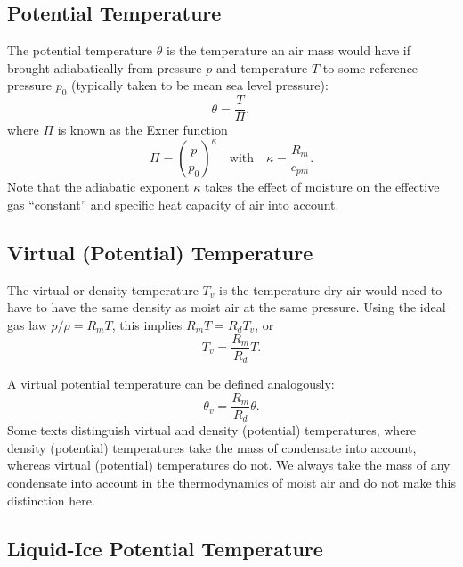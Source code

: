 \documentclass{report}
\begin{document}
\subsection{Potential Temperature} The potential temperature $\theta$ is the temperature an air mass would have if brought adiabatically from pressure $p$ and temperature $T$ to some reference pressure $p_0$ (typically taken to be mean sea level pressure):
\begin{equation}\label{e:pot_temp_press_T}
\theta = \frac{T}{\Pi},  
\end{equation}
where $\Pi$ is known as the Exner function
\begin{equation}
    \Pi  = \left( \frac{p}{p_0} \right)^\kappa \quad \text{with} \quad \kappa = \frac{R_m}{c_{pm}}.
\end{equation}
Note that the adiabatic exponent $\kappa$ takes the effect of  moisture on the effective gas ``constant'' and specific heat capacity of air into account.

\subsection{Virtual (Potential) Temperature} The virtual or density temperature $T_v$ is the temperature dry air would need to have to have the same density as moist air at the same pressure. Using the ideal gas law $p/\rho = R_m T$, this implies $R_m T  = R_d T_v $, or
\begin{equation}\label{e:virtual_temp}
T_v = \frac{R_m}{R_d} T.
\end{equation}

A virtual potential temperature can be defined analogously:
\begin{equation}\label{e:virtual_pottemp}
\theta_v = \frac{R_m}{R_d} \theta.
\end{equation}
Some texts distinguish virtual and density (potential) temperatures, where density (potential) temperatures take the mass of condensate into account, whereas virtual (potential) temperatures do not. We always take the mass of any condensate into account in the thermodynamics of moist air and do not make this distinction here. 

\subsection{Liquid-Ice Potential Temperature}
\end{document}
